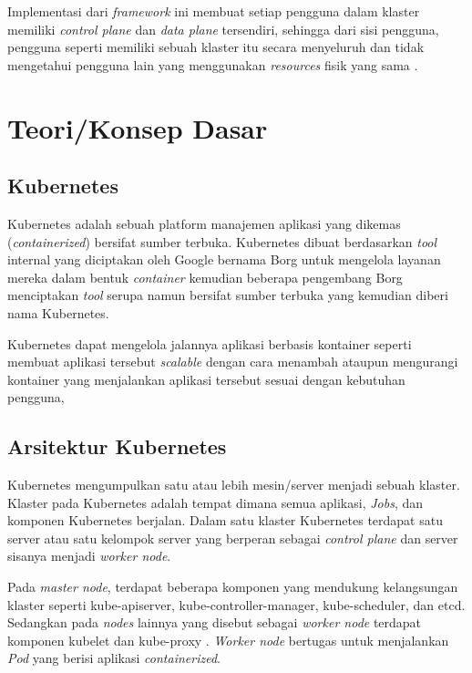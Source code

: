 Implementasi dari \emph{framework} ini membuat setiap pengguna dalam klaster
memiliki \emph{control plane} dan \emph{data plane} tersendiri, sehingga dari
sisi pengguna, pengguna seperti memiliki sebuah klaster itu secara menyeluruh
dan tidak mengetahui pengguna lain yang menggunakan \emph{resources} fisik yang sama
\parencite{9546524}.

\section{Teori/Konsep Dasar}

\subsection{Kubernetes}

Kubernetes adalah sebuah platform manajemen aplikasi yang dikemas (\emph{containerized})
bersifat sumber terbuka. Kubernetes dibuat berdasarkan \emph{tool} internal
yang diciptakan oleh Google bernama Borg untuk mengelola layanan mereka dalam bentuk
\emph{container} \parencite{43438} kemudian beberapa pengembang Borg menciptakan
\emph{tool} serupa namun bersifat sumber terbuka yang kemudian diberi nama Kubernetes.

Kubernetes dapat mengelola jalannya aplikasi berbasis kontainer seperti membuat
aplikasi tersebut \emph{scalable} dengan cara menambah ataupun mengurangi kontainer
yang menjalankan aplikasi tersebut sesuai dengan kebutuhan pengguna, 

\subsection{Arsitektur Kubernetes}

Kubernetes mengumpulkan satu atau lebih mesin/server menjadi sebuah klaster. Klaster
pada Kubernetes adalah tempat dimana semua aplikasi, \emph{Jobs}, dan komponen Kubernetes
berjalan. Dalam satu klaster Kubernetes terdapat satu server atau satu kelompok server
yang berperan sebagai \emph{control plane} dan server sisanya menjadi \emph{worker node}.

Pada \emph{master node}, terdapat beberapa komponen yang mendukung kelangsungan
klaster seperti kube-apiserver, kube-controller-manager, kube-scheduler, dan etcd.
Sedangkan pada \emph{nodes} lainnya yang disebut sebagai \emph{worker node}
terdapat komponen kubelet dan kube-proxy \parencite{kubernetes-website-components}.
\emph{Worker node} bertugas untuk menjalankan \emph{Pod} yang berisi aplikasi
\emph{containerized}.

